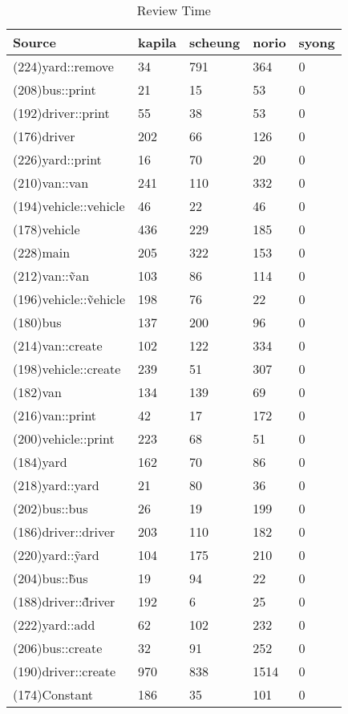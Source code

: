 \begin{table}[hb]
\begin{center}
\begin{tabular}{|l|l|l|l|l|}
\hline
Source & kapila & scheung & norio & syong\\
\hline
(224)yard::remove & 34 & 791 & 364 & 0\\
(208)bus::print & 21 & 15 & 53 & 0\\
(192)driver::print & 55 & 38 & 53 & 0\\
(176)driver & 202 & 66 & 126 & 0\\
(226)yard::print & 16 & 70 & 20 & 0\\
(210)van::van & 241 & 110 & 332 & 0\\
(194)vehicle::vehicle & 46 & 22 & 46 & 0\\
(178)vehicle & 436 & 229 & 185 & 0\\
(228)main & 205 & 322 & 153 & 0\\
(212)van::\~van & 103 & 86 & 114 & 0\\
(196)vehicle::\~vehicle & 198 & 76 & 22 & 0\\
(180)bus & 137 & 200 & 96 & 0\\
(214)van::create & 102 & 122 & 334 & 0\\
(198)vehicle::create & 239 & 51 & 307 & 0\\
(182)van & 134 & 139 & 69 & 0\\
(216)van::print & 42 & 17 & 172 & 0\\
(200)vehicle::print & 223 & 68 & 51 & 0\\
(184)yard & 162 & 70 & 86 & 0\\
(218)yard::yard & 21 & 80 & 36 & 0\\
(202)bus::bus & 26 & 19 & 199 & 0\\
(186)driver::driver & 203 & 110 & 182 & 0\\
(220)yard::\~yard & 104 & 175 & 210 & 0\\
(204)bus::\~bus & 19 & 94 & 22 & 0\\
(188)driver::\~driver & 192 & 6 & 25 & 0\\
(222)yard::add & 62 & 102 & 232 & 0\\
(206)bus::create & 32 & 91 & 252 & 0\\
(190)driver::create & 970 & 838 & 1514 & 0\\
(174)Constant & 186 & 35 & 101 & 0\\
\hline
\end{tabular}
\end{center}
\caption{Review Time}
\end{table}


